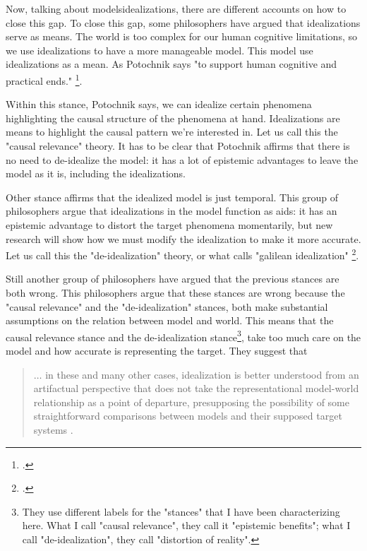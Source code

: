 Now, talking about models\/idealizations, there are different accounts on how to close this gap.
To close this gap, some philosophers have argued that idealizations serve as means.
The world is too complex for our human cognitive limitations, so we use idealizations to have a more manageable model.
This model use idealizations as a mean. As Potochnik says "to support human cognitive and practical ends." \footcite[][p. ix]{Potochnik2017-POTIAT-3}.

Within this stance, Potochnik says, we can idealize certain phenomena highlighting the causal structure of the phenomena at hand.
Idealizations are means to highlight the causal pattern we're interested in.
Let us call this the "causal relevance" theory.
It has to be clear that Potochnik affirms that there is no need to de-idealize the model: it has a lot of epistemic advantages to leave the model as it is, including the idealizations.

Other stance affirms that the idealized model is just temporal.
This group of philosophers argue that idealizations in the model function as aids: it has an epistemic advantage to distort the target phenomena momentarily, but new research will show how we must modify the idealization to make it more accurate.
Let us call this the "de-idealization" theory, or what \citeauthor{Weisberg2007} calls "galilean idealization" \footcite{Weisberg2007}.

Still another group of philosophers have argued that the previous stances are both wrong.
This philosophers argue that these stances are wrong because the "causal relevance" and the "de-idealization" stances, both make substantial assumptions on the relation between model and world.
This means that the causal relevance stance and the de-idealization stance\footnote{They use different labels for the "stances" that I have been characterizing here. What I call "causal relevance", they call it "epistemic benefits"; what I call "de-idealization", they call "distortion of reality".}, take too much care on the model and how accurate is representing the target.
They suggest that

\begin{quote}
	$\ldots$ in these and many other cases, idealization is better understood from an artifactual perspective that does not take the representational model-world relationship as a point of departure, presupposing the possibility of some straightforward comparisons between models and their supposed target systems \parencite[][p. 2]{Carrillo2021-CARAAP-12}.
\end{quote}

